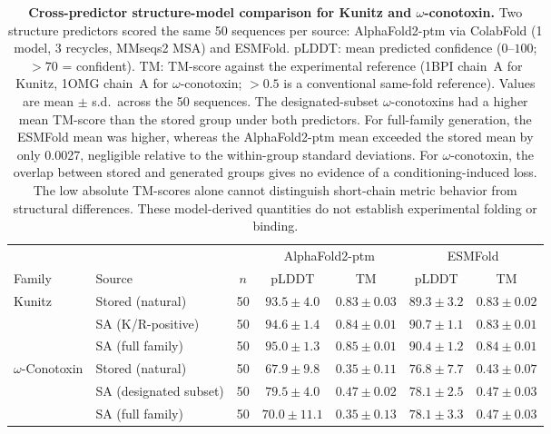 \documentclass{article}
\theoremstyle{definition}
\theoremstyle{remark}
\begin{document}
\begin{table}[p]
  \centering
  \caption{\textbf{Cross-predictor structure-model comparison for Kunitz and
  $\omega$-conotoxin.}
  Two structure predictors scored the same 50 sequences per source:
  AlphaFold2-ptm via ColabFold (1 model, 3 recycles, MMseqs2 MSA) and ESMFold.
  pLDDT: mean predicted confidence ($0$--$100$; $>70$ = confident).
  TM: TM-score against the experimental reference (1BPI chain~A for Kunitz,
  1OMG chain~A for $\omega$-conotoxin; $>0.5$ is a conventional same-fold reference).
  Values are mean $\pm$ s.d.\ across the 50 sequences.
  The designated-subset $\omega$-conotoxins had a higher mean TM-score than the stored group
  under both predictors. For full-family generation, the ESMFold mean was higher, whereas the
  AlphaFold2-ptm mean exceeded the stored mean by only 0.0027, negligible relative to the
  within-group standard deviations. For $\omega$-conotoxin, the overlap between stored
  and generated groups gives no evidence of a conditioning-induced loss. The low absolute
  TM-scores alone cannot distinguish short-chain metric behavior from structural
  differences. These model-derived quantities do not establish experimental folding or
  binding.}
  \label{tab:structure-model-comparison}
  \small
  \begin{tabular}{llccccc}
    \toprule
    & & & \multicolumn{2}{c}{AlphaFold2-ptm} & \multicolumn{2}{c}{ESMFold} \\
    \cmidrule(lr){4-5}\cmidrule(lr){6-7}
    Family & Source & $n$ & pLDDT & TM & pLDDT & TM \\
    \midrule
    \multirow{3}{*}{Kunitz}
      & Stored (natural)       & 50 & $93.5 \pm 4.0$  & $0.83 \pm 0.03$ & $89.3 \pm 3.2$ & $0.83 \pm 0.02$ \\
      & SA (K/R-positive)      & 50 & $94.6 \pm 1.4$  & $0.84 \pm 0.01$ & $90.7 \pm 1.1$ & $0.83 \pm 0.01$ \\
      & SA (full family)       & 50 & $95.0 \pm 1.3$  & $0.85 \pm 0.01$ & $90.4 \pm 1.2$ & $0.84 \pm 0.01$ \\
    \midrule
    \multirow{3}{*}{$\omega$-Conotoxin}
      & Stored (natural)       & 50 & $67.9 \pm 9.8$  & $0.35 \pm 0.11$ & $76.8 \pm 7.7$ & $0.43 \pm 0.07$ \\
      & SA (designated subset) & 50 & $79.5 \pm 4.0$  & $0.47 \pm 0.02$ & $78.1 \pm 2.5$ & $0.47 \pm 0.03$ \\
      & SA (full family)       & 50 & $70.0 \pm 11.1$ & $0.35 \pm 0.13$ & $78.1 \pm 3.3$ & $0.47 \pm 0.03$ \\
    \bottomrule
  \end{tabular}
\end{table}
\end{document}
